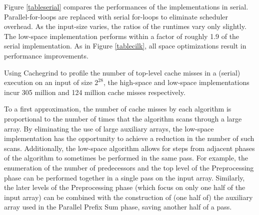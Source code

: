\documentclass[11pt]{article}
\renewcommand{\paragraph}[1]{\vspace{0.09in}\noindent{\bf \boldmath #1.}}
\theoremstyle{remark}
\theoremstyle{remark}
\begin{document}
Figure \ref{tableserial} compares the performances of the
implementations in serial. Parallel-for-loops are replaced with serial
for-loops to eliminate scheduler overhead. As the input-size varies,
the ratios of the runtimes vary only slightly. The low-space
implementation performs within a factor of roughly 1.9 of the serial
implementation. As in Figure \ref{tablecilk},
all space optimizations result in performance improvements.

\paragraph{The Source of the Speedup}

Using Cachegrind to profile the number of top-level cache misses in a (serial) execution
on an input of size $2^{28}$, the high-space and
low-space implementations incur 305 million and 124
million cache misses respectively.

To a first approximation, the number of cache misses by each algorithm
is proportional to the number of times that the algorithm scans
through a large array. By eliminating the use of large auxiliary
arrays, the low-space implementation has the opportunity to achieve a
reduction in the number of such scans. Additionally, the low-space
algorithm allows for steps from adjacent phases of the algorithm to
sometimes be performed in the same pass. For example, the enumeration
of the number of predecessors and the top level of the Preprocessing
phase can be performed together in a single pass on the input
array. Similarly, the later levels of the Preprocessing phase (which
focus on only one half of the input array) can be combined with the
construction of (one half of) the auxiliary array used in the Parallel
Prefix Sum phase, saving another half of a pass.


\end{document}
